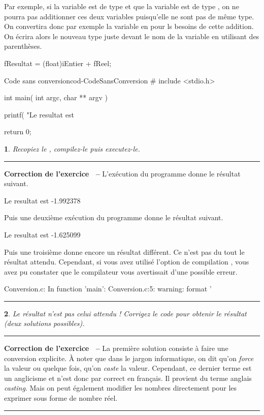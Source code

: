 \documentclass[a4paper]{article}
\newenvironment{Correction}{\par\tiny\blue\rule[1ex]{\textwidth}{1pt}\par\normalsize\textbf{\sffamily{}Correction de l'exercice~\theExo{} -- }}{\par\tiny\blue\rule[1ex]{\textwidth}{1pt}\par}
\newtheorem{Exo}{{\sffamily{Exercice}}}
\begin{document}
{		Par exemple, si la variable  est de type  et que la variable  est de type , on ne pourra pas additionner ces deux variables puisqu'elle ne sont pas de même type.
		On convertira donc par exemple la variable  en  pour ls besoins de cette addition.
		On écrira alors le nouveau type juste devant le nom de la variable en utilisant des parenthèses.
		\begin{Code*}
fResultat = (float)iEntier + fReel;
		\end{Code*}

		\begin{Code}{Code sans conversion}{cod-CodeSansConversion}
# include <stdio.h>

int main( int argc, char ** argv )
{
	printf( "Le resultat est %

	return 0;
}
		\end{Code}
		\begin{Exo}
			Recopiez le , compilez-le puis executez-le.
		\end{Exo}
			\begin{Correction}
				L'exécution du programme donne le résultat suivant.
				\begin{Code*}
					Le resultat est -1.992378
				\end{Code*}
				Puis une deuxième exécution du programme donne le résultat suivant.
				\begin{Code*}
					Le resultat est -1.625099
				\end{Code*}
				Puis une troisième donne encore un résultat différent.
				Ce n'est pas du tout le résultat attendu.
				Cependant, si vous avez utilisé l'option de compilation , vous avez pu constater que le compilateur vous avertissait d'une possible erreur.
				\begin{Code*}
Conversion.c: In function 'main':
Conversion.c:5: warning: format '%
				\end{Code*}
			\end{Correction}
		\begin{Exo}
			Le résultat n'est pas celui attendu ! Corrigez le code pour obtenir le résultat  (deux solutions possibles).
		\end{Exo}
		\begin{Correction}
			La première solution consiste à faire une conversion explicite.
			À noter que dans le jargon informatique, on dit qu'on \emph{force} la valeur ou quelque fois, qu'on \emph{caste} la valeur.
			Cependant, ce dernier terme est un anglicisme et n'est donc par correct en français.
			Il provient du terme anglais \emph{casting}.
			Mais on peut également modifier les nombres directement pour les exprimer sous forme de nombre réel.
		\end{Correction}

}
\end{document}
